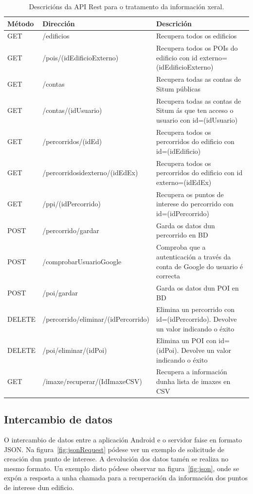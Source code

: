 \begin{table} [!h]
	\footnotesize
	\centering
	\begin{tabular}{|l|p{5cm}|p{7cm}|}
		\hline 
		\textbf{Método}	& \textbf{Dirección} & \textbf{Descrición} \\ 
		\hline 
		GET & /edificios & Recupera todos os edificios \\ 
		\hline 
		GET & /pois/(idEdificioExterno) & Recupera todos os POIs do edificio con id externo=(idEdificioExterno) \\ 
		\hline 
		GET & /contas & Recupera todas as contas de Situm públicas \\ 
		\hline 
		GET & /contas/(idUsuario) & Recupera todas as contas de Situm ás que ten acceso o usuario con id=(idUsuario) \\ 
		\hline 
		GET & /percorridos/(idEd) & Recupera todos os percorridos do edificio con id=(idEdificio) \\ 
		\hline 
		GET & /percorridosidexterno/(idEdEx) & Recupera todos os percorridos do edificio con id externo=(idEdEx) \\ 
		\hline 
		GET & /ppi/(idPercorrido) & Recupera os puntos de interese do percorrido con id=(idPercorrido) \\ 
		\hline 
		POST & /percorrido/gardar & Garda os datos dun percorrido en BD \\ 
		\hline 
		POST & /comprobarUsuarioGoogle & Comproba que a autenticación a través da conta de Google do usuario é correcta \\ 
		\hline 
		POST & /poi/gardar & Garda os datos dun POI en BD \\ 
		\hline 
		DELETE & /percorrido/eliminar/(idPercorrido) & Elimina un percorrido con id=(idPercorrido). Devolve un valor indicando o éxito \\ 
		\hline 
		DELETE & /poi/eliminar/(idPoi) & Elimina un POI con id=(idPoi). Devolve un valor indicando o éxito \\ 
		\hline 
		GET & /imaxe/recuperar/(IdImaxeCSV) & Recupera a información dunha lista de imaxes en CSV \\ 
		\hline 
	\end{tabular}
	\caption{Descricións da API Rest para o tratamento da información xeral.}
	\label{tab:APIXeral}
\end{table}

\subsection{Intercambio de datos}
O intercambio de datos entre a aplicación Android e o servidor faise en formato JSON. Na figura~\ref{fig:jsonRequest} pódese ver un exemplo de solicitude de creación dun punto de interese. A devolución dos datos tamén se realiza no mesmo formato. Un exemplo disto pódese observar na figura~\ref{fig:json}, onde se expón a resposta a unha chamada para a recuperación da información dos puntos de interese dun edificio.

